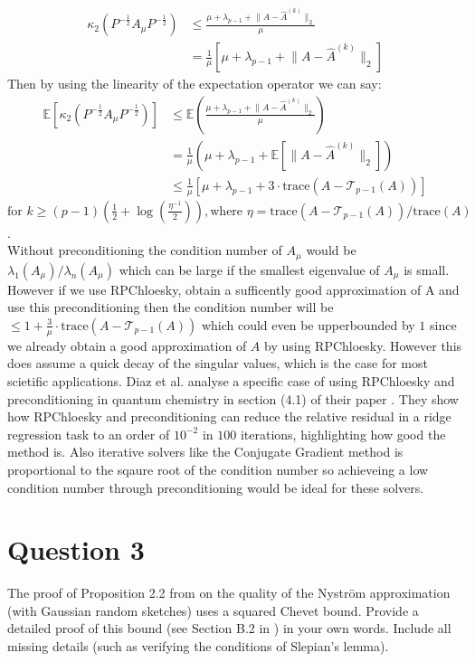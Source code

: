 \begin{align*}
    \kappa_2(P^{-\frac{1}{2}}A_{\mu}P^{-\frac{1}{2}}) & \leq \frac{\mu + \lambda_{p-1} + \lVert A - \hat{A}^{(k)}\rVert_2}{\mu} \\
                                                      &= \frac{1}{\mu}\left[\mu + \lambda_{p-1} + \lVert A - \hat{A}^{(k)}\rVert_2 \right]
\end{align*}
Then by using the linearity of the expectation operator we can say:
\begin{align*}
    \mathds{E}\left[\kappa_2(P^{-\frac{1}{2}}A_{\mu}P^{-\frac{1}{2}})\right] & \leq \mathds{E}\left(\frac{\mu + \lambda_{p-1} + \lVert A - \hat{A}^{(k)}\rVert_2}{\mu}\right) \\
                                                      &= \frac{1}{\mu}\left(\mu + \lambda_{p-1} + \mathds{E}\left[\lVert A - \hat{A}^{(k)}\rVert_2\right] \right) \\
                                                      &\leq \frac{1}{\mu}\left[\mu + \lambda_{p-1} + 3\cdot\text{trace}(A - \mathcal{T}_{p-1}(A))\right]
\end{align*}
$\text{for } k \geq (p-1)(\frac{1}{2} + \log{(\frac{\eta^{-1}}{2})}), \text{where } \eta = \text{trace}(A -
\mathcal{T}_{p-1}(A)) / \text{trace}(A)$. \\
Without preconditioning the condition number of $A_{\mu}$ would be $\lambda_1(A_{\mu}) / \lambda_n(A_{\mu})$ which can
be large if the smallest eigenvalue of $A_{\mu}$ is small. However if we use RPChloesky, obtain a sufficently good
approximation of A and use this preconditioning then the condition number will be $\leq 1 +
\frac{3}{\mu}\cdot\text{trace}(A - \mathcal{T}_{p-1}(A))$ which could even be upperbounded by $1$ since we already
obtain a good approximation of $A$ by using RPChloesky. However this does assume a quick decay of the singular values,
which is the case for most scietific applications. Diaz et al. analyse a specific case of using RPChloesky and
preconditioning in quantum chemistry in section (4.1) of their paper
\cite{díaz2024robustrandomizedpreconditioningkernel}. They show how RPChloesky and preconditioning can reduce the
relative residual in a ridge regression task to an order of $10^{-2}$ in $100$ iterations, highlighting how good the
method is. Also iterative solvers like the Conjugate Gradient method is proportional to the sqaure root of the condition
number so achieveing a low condition number through preconditioning would be ideal for these solvers.

\section{Question 3}
The proof of Proposition 2.2 from \cite{frangella2021randomizednystrompreconditioning} on the quality of the Nyström
approximation (with Gaussian random sketches) uses a squared Chevet bound. Provide a detailed proof of this bound (see
Section B.2 in \cite{frangella2021randomizednystrompreconditioning}) in your own words. Include all missing details
(such as verifying the conditions of Slepian’s lemma). \\


